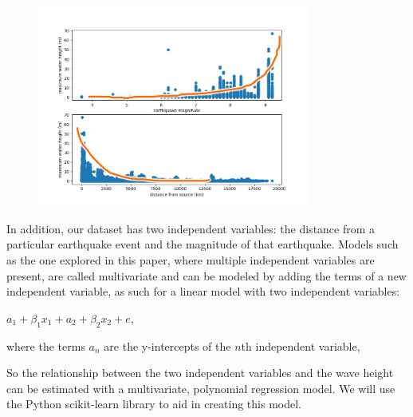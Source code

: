 \documentclass[11pt,letterpaper]{article}
\begin{document}
\begin{figure}[h]
    \centering
    \includegraphics[width=0.8\textwidth]{modelshowcase.jpeg}
    \label{fig:boat1}
\end{figure}

In addition, our dataset has two independent variables: the distance from a particular
earthquake event and the magnitude of that earthquake. Models such as the one explored 
in this paper, where multiple independent variables are present, are called multivariate 
and can be modeled by adding the terms of a new independent variable, as such 
for a linear model with two independent variables:

$a_1 + \beta_1 x_1 + a_2 + \beta_2 x_2 + e$, 

where the terms $a_n$ are the y-intercepts of the $n$th independent variable, 


So the relationship between the two independent variables and the wave height can
be estimated with a multivariate, polynomial regression model. We will use the Python
scikit-learn library to aid in creating this model.
\end{document}
